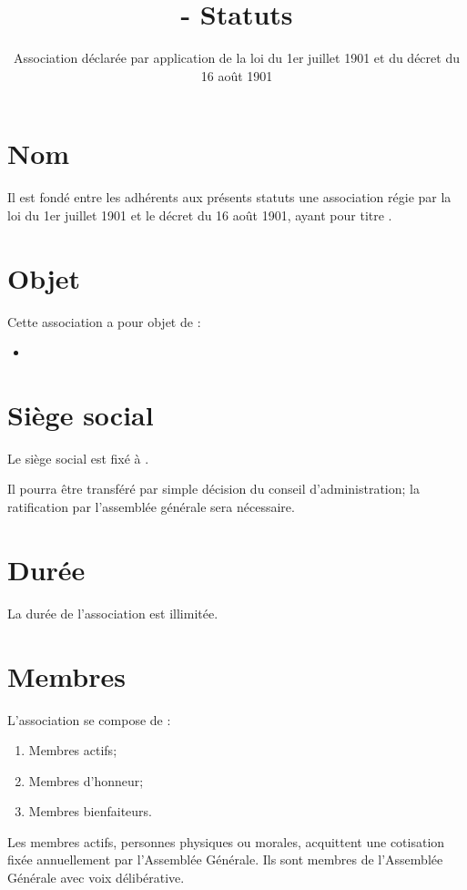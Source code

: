 \documentclass[12pt]{constitution}
\def\nomAssociation{} %
\def\adresseAssociation{} %
\def\objetAssociation{} %
\def\dateStatuts{} %
\begin{document}
\title{\nomAssociation - Statuts}
\author{Association déclarée par application de la loi du 1er juillet 1901 et du décret du 16 août 1901}
\date{\dateStatuts}
\maketitle
\newpage

\section{Nom}
Il est fondé entre les adhérents aux présents statuts une association régie par la loi du 1er juillet 1901 et le décret du 16 août 1901, ayant pour titre \nomAssociation.

\section{Objet}
Cette association a pour objet de :
\begin{itemize}
	\item \objetAssociation
\end{itemize}

\section{Siège social}
Le siège social est fixé à \adresseAssociation.

Il pourra être transféré par simple décision du conseil d'administration; la ratification par l’assemblée générale sera nécessaire.

\section{Durée}
La durée de l’association est illimitée.


\section{Membres}
L'association se compose de :
\begin{enumerate}
	\item Membres actifs;
	\item Membres d'honneur;
	\item Membres bienfaiteurs.
\end{enumerate}

\medskip
Les membres actifs, personnes physiques ou morales, acquittent une cotisation fixée annuellement par l'Assemblée Générale. Ils sont membres de l'Assemblée Générale avec voix délibérative.
\end{document}
